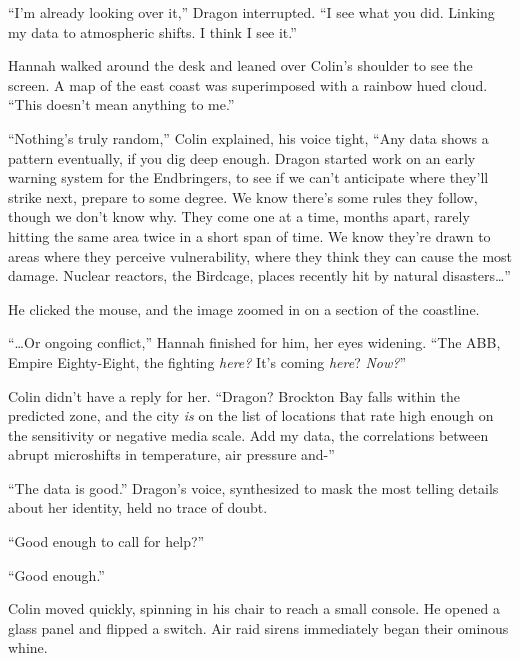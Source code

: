 ``I'm already looking over it,'' Dragon interrupted.  ``I see what you did.  Linking my data to atmospheric shifts.  I think I see it.''



Hannah walked around the desk and leaned over Colin's shoulder to see the screen.  A map of the east coast was superimposed with a rainbow hued cloud.  ``This doesn't mean anything to me.''



``Nothing's truly random,'' Colin explained, his voice tight, ``Any data shows a pattern eventually, if you dig deep enough.  Dragon started work on an early warning system for the Endbringers, to see if we can't anticipate where they'll strike next, prepare to some degree.  We know there's some rules they follow, though we don't know why.  They come one at a time, months apart, rarely hitting the same area twice in a short span of time.  We know they're drawn to areas where they perceive vulnerability, where they think they can cause the most damage.  Nuclear reactors, the Birdcage, places recently hit by natural disasters\ldots''



He clicked the mouse, and the image zoomed in on a section of the coastline.



``\ldots{}Or ongoing conflict,'' Hannah finished for him, her eyes widening.  ``The ABB, Empire Eighty-Eight, the fighting \emph{here?} It's coming \emph{here}? \emph{Now?}''



Colin didn't have a reply for her.  ``Dragon?  Brockton Bay falls within the predicted zone, and the city \emph{is} on the list of locations that rate high enough on the sensitivity or negative media scale.  Add my data, the correlations between abrupt microshifts in temperature, air pressure and-''



``The data is good.'' Dragon's voice, synthesized to mask the most telling details about her identity, held no trace of doubt.



``Good enough to call for help?''



``Good enough.''



Colin moved quickly, spinning in his chair to reach a small console.  He opened a glass panel and flipped a switch.  Air raid sirens immediately began their ominous whine.




